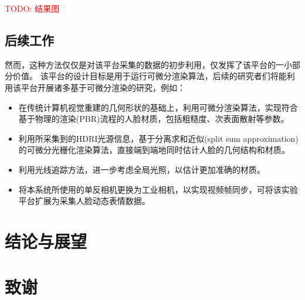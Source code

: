 \documentclass{scutmaster}
\newcommand{\TODO}[1]{\textcolor{red}{TODO: #1}}
\begin{document}
\TODO{结果图}

\section{后续工作}

然而，这种方法仅仅是对该平台采集的数据的初步利用，仅发挥了该平台的一小部分价值。
该平台的设计目标是用于运行可微分渲染算法，后续的研究者们将能利用该平台开展诸多基于可微分渲染的研究，例如：
\begin{itemize}
\item 在传统计算机视觉重建的几何形状的基础上，利用可微分渲染算法，实现符合基于物理的渲染(PBR)流程的人脸材质，包括粗糙度、次表面散射等参数。
\item 利用所采集到的HDRI光源信息，基于分离求和近似(split sum approximation)的可微分光栅化渲染算法，直接端到端地同时估计人脸的几何结构和材质。
\item 利用光线追踪方法，进一步考虑全局光照，以估计更加准确的材质。
\item 将本系统所使用的单反相机更换为工业相机，以实现视频帧同步，可将该实验平台扩展为采集人脸动态表情数据。
\end{itemize}

\chapter{结论与展望}

\backmatter


\chapter{致谢}
\end{document}
